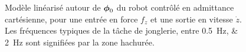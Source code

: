 \begin{figure}[!htb]
	\caption[Diagramme de Bode du modèle linéaire du robot contrôlé en admittance cartésienne, pour une sortie en vitesse]{Modèle linéarisé autour de $\vect{\phi}_0$ du robot contrôlé en admittance cartésienne, pour une entrée en force $f_z$ et une sortie en vitesse $\dot{z}$. Les fréquences typiques de la tâche de jonglerie, entre \SIlist{0.5;2}{\hertz} sont signifiées par la zone hachurée.}
	\label{fig_robot_dynamic_model_bode_diagram}
\end{figure}